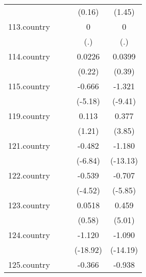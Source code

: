 {\begin{tabular}{l*{4}{c}}
            &                     &                     &      (0.16)         &      (1.45)         \\
[1em]
113.country &                     &                     &           0         &           0         \\
            &                     &                     &         (.)         &         (.)         \\
[1em]
114.country &                     &                     &      0.0226         &      0.0399         \\
            &                     &                     &      (0.22)         &      (0.39)         \\
[1em]
115.country &                     &                     &      -0.666\sym{***}&      -1.321\sym{***}\\
            &                     &                     &     (-5.18)         &     (-9.41)         \\
[1em]
119.country &                     &                     &       0.113         &       0.377\sym{***}\\
            &                     &                     &      (1.21)         &      (3.85)         \\
[1em]
121.country &                     &                     &      -0.482\sym{***}&      -1.180\sym{***}\\
            &                     &                     &     (-6.84)         &    (-13.13)         \\
[1em]
122.country &                     &                     &      -0.539\sym{***}&      -0.707\sym{***}\\
            &                     &                     &     (-4.52)         &     (-5.85)         \\
[1em]
123.country &                     &                     &      0.0518         &       0.459\sym{***}\\
            &                     &                     &      (0.58)         &      (5.01)         \\
[1em]
124.country &                     &                     &      -1.120\sym{***}&      -1.090\sym{***}\\
            &                     &                     &    (-18.92)         &    (-14.19)         \\
[1em]
125.country &                     &                     &      -0.366\sym{**} &      -0.938\sym{***}\\

\end{tabular}}
